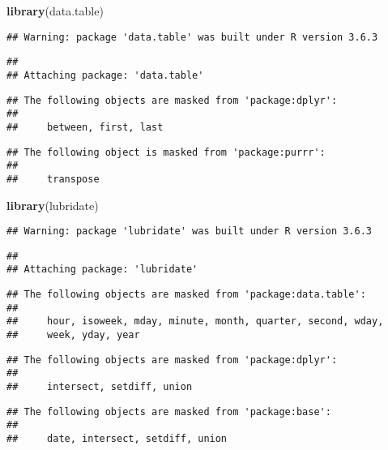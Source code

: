 \documentclass[]{article}
\newenvironment{Shaded}{\begin{snugshade}}{\end{snugshade}}
\newcommand{\KeywordTok}[1]{\textcolor[rgb]{0.13,0.29,0.53}{\textbf{#1}}}
\newcommand{\NormalTok}[1]{#1}
\begin{document}
\begin{Shaded}
\begin{Highlighting}[]
\KeywordTok{library}\NormalTok{(data.table)}
\end{Highlighting}
\end{Shaded}

\begin{verbatim}
## Warning: package 'data.table' was built under R version 3.6.3
\end{verbatim}

\begin{verbatim}
## 
## Attaching package: 'data.table'
\end{verbatim}

\begin{verbatim}
## The following objects are masked from 'package:dplyr':
## 
##     between, first, last
\end{verbatim}

\begin{verbatim}
## The following object is masked from 'package:purrr':
## 
##     transpose
\end{verbatim}

\begin{Shaded}
\begin{Highlighting}[]
\KeywordTok{library}\NormalTok{(lubridate)}
\end{Highlighting}
\end{Shaded}

\begin{verbatim}
## Warning: package 'lubridate' was built under R version 3.6.3
\end{verbatim}

\begin{verbatim}
## 
## Attaching package: 'lubridate'
\end{verbatim}

\begin{verbatim}
## The following objects are masked from 'package:data.table':
## 
##     hour, isoweek, mday, minute, month, quarter, second, wday,
##     week, yday, year
\end{verbatim}

\begin{verbatim}
## The following objects are masked from 'package:dplyr':
## 
##     intersect, setdiff, union
\end{verbatim}

\begin{verbatim}
## The following objects are masked from 'package:base':
## 
##     date, intersect, setdiff, union
\end{verbatim}
\end{document}

